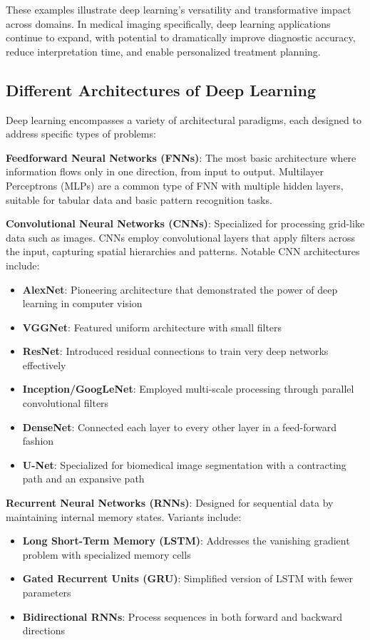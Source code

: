 These examples illustrate deep learning's versatility and transformative impact across domains. In medical imaging specifically, deep learning applications continue to expand, with potential to dramatically improve diagnostic accuracy, reduce interpretation time, and enable personalized treatment planning.

\subsection{Different Architectures of Deep Learning}
\label{sec:dl_architectures}
Deep learning encompasses a variety of architectural paradigms, each designed to address specific types of problems:

\textbf{Feedforward Neural Networks (FNNs)}:
The most basic architecture where information flows only in one direction, from input to output. Multilayer Perceptrons (MLPs) are a common type of FNN with multiple hidden layers, suitable for tabular data and basic pattern recognition tasks.

\textbf{Convolutional Neural Networks (CNNs)}:
Specialized for processing grid-like data such as images. CNNs employ convolutional layers that apply filters across the input, capturing spatial hierarchies and patterns. Notable CNN architectures include:
\begin{itemize}
  \item \textbf{AlexNet}: Pioneering architecture that demonstrated the power of deep learning in computer vision \cite{krizhevsky2012imagenet}
  \item \textbf{VGGNet}: Featured uniform architecture with small filters \cite{simonyan2014very}
  \item \textbf{ResNet}: Introduced residual connections to train very deep networks effectively \cite{he2016deep}
  \item \textbf{Inception/GoogLeNet}: Employed multi-scale processing through parallel convolutional filters \cite{szegedy2015going}
  \item \textbf{DenseNet}: Connected each layer to every other layer in a feed-forward fashion \cite{huang2017densely}
  \item \textbf{U-Net}: Specialized for biomedical image segmentation with a contracting path and an expansive path \cite{ronneberger2015unet}
\end{itemize}

\textbf{Recurrent Neural Networks (RNNs)}:
Designed for sequential data by maintaining internal memory states. Variants include:
\begin{itemize}
  \item \textbf{Long Short-Term Memory (LSTM)}: Addresses the vanishing gradient problem with specialized memory cells \cite{hochreiter1997long}
  \item \textbf{Gated Recurrent Units (GRU)}: Simplified version of LSTM with fewer parameters \cite{cho2014learning}
  \item \textbf{Bidirectional RNNs}: Process sequences in both forward and backward directions
\end{itemize}

